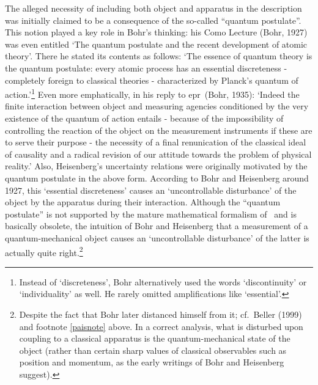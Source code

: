 \documentclass[12pt,titlepage]{article}
\newcommand{\epr}{{\sc epr}}
\begin{document}
The alleged necessity of including both object and apparatus in the description was initially claimed to be a consequence of the so-called ``quantum postulate''. This notion played a key role in Bohr's thinking: his  Como Lecture (Bohr, 1927) was even entitled `The quantum postulate and the recent development of atomic theory'.  There he stated
its contents as follows:  `The essence of quantum theory is the quantum postulate: every atomic process has an essential discreteness -  completely foreign to classical theories - characterized by Planck's quantum of action.'\footnote{Instead of `discreteness', Bohr alternatively used the words  `discontinuity' or `individuality' as well. He rarely omitted amplifications like `essential'.} Even more emphatically, in his reply to \epr\ (Bohr, 1935):
`Indeed the finite interaction between object and measuring agencies conditioned by the very existence of the  quantum of action entails - because of the impossibility of controlling the reaction of the object on the measurement instruments if these are to serve their purpose - the necessity of a final renunication of the classical ideal of causality and a radical revision of our attitude towards the problem of physical reality.'
  Also, Heisenberg's uncertainty relations were originally motivated by the quantum postulate in the above form.
According to Bohr and Heisenberg around 1927, this `essential discreteness' causes an 
`uncontrollable disturbance' of the object by the apparatus during their interaction.
Although the ``quantum postulate'' is not supported by the mature mathematical formalism of \qm\ and is basically obsolete, the intuition of Bohr and Heisenberg that a measurement of a quantum-mechanical object causes an `uncontrollable disturbance' of the latter is actually quite right.\footnote{Despite the fact that  Bohr later distanced himself from it; cf.\ Beller (1999) and footnote  \ref{paisnote} above. In a correct analysis, what is disturbed upon coupling to a classical apparatus is the quantum-mechanical state of the object (rather than certain sharp values of  classical observables such as position and momentum, as the early writings of Bohr and Heisenberg suggest). } 
\end{document}
